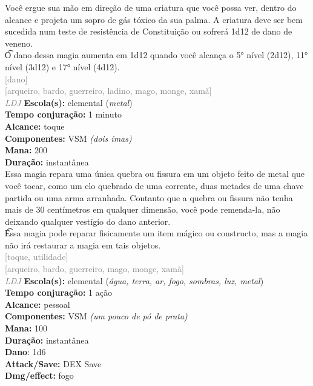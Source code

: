\documentclass{RPG_Adventure}[2021/10/20]
\begin{document}
{\normalsize Você ergue sua mão em direção de uma criatura que você possa ver, dentro do alcance e projeta um sopro de gás tóxico da sua palma. A criatura deve ser bem sucedida num teste de resistência de Constituição ou sofrerá 1d12 de dano de veneno.\\\t O dano dessa magia aumenta em 1d12 quando você alcança o 5° nível (2d12), 11° nível (3d12) e 17° nível (4d12).\\}
{\scriptsize \textcolor{gray}{[dano]\\}}
{\scriptsize \textcolor{gray}{[arqueiro, bardo, guerreiro, ladino, mago, monge, xamã]\\}}
{\tiny \textcolor{gray}{\textit{LDJ}}}\jump{}
{\small \t \textbf{Escola(s):} elemental (\textit{metal})\\\t \textbf{Tempo conjuração:} 1 minuto\\\t \textbf{Alcance:} toque\\\t \textbf{Componentes:} VSM \textit{(dois ímas)}\\\t \textbf{Mana:} 200\\\t \textbf{Duração:} instantânea\\}
{\normalsize Essa magia repara uma única quebra ou fissura em um objeto feito de metal que você tocar, como um elo quebrado de uma corrente, duas metades de uma chave partida ou uma arma arranhada. Contanto que a quebra ou fissura não tenha mais de 30 centímetros em qualquer dimensão, você pode remenda-la, não deixando qualquer vestígio do dano anterior.\\\t Essa magia pode reparar fisicamente um item mágico ou constructo, mas a magia não irá restaurar a magia em tais objetos.\\}
{\scriptsize \textcolor{gray}{[toque, utilidade]\\}}
{\scriptsize \textcolor{gray}{[arqueiro, bardo, guerreiro, mago, monge, xamã]\\}}
{\tiny \textcolor{gray}{\textit{LDJ}}}\jump{}
{\small \t \textbf{Escola(s):} elemental (\textit{água, terra, ar, fogo, sombras, luz, metal})\\\t \textbf{Tempo conjuração:} 1 ação\\\t \textbf{Alcance:} pessoal\\\t \textbf{Componentes:} VSM \textit{(um pouco de pó de prata)}\\\t \textbf{Mana:} 100\\\t \textbf{Duração:} instantânea\\\t \textbf{Dano}: 1d6\\\t \textbf{Attack/Save:} DEX Save\\\t \textbf{Dmg/effect:} fogo\\}
\end{document}
